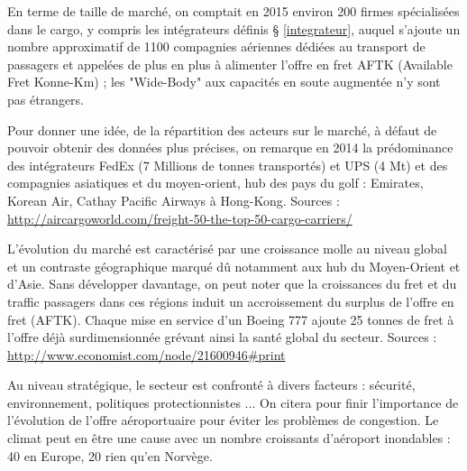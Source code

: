 En terme de taille de marché, on comptait en 2015 environ 200 firmes spécialisées dans le cargo, y compris les intégrateurs définis § \ref{integrateur}, auquel s'ajoute un nombre approximatif de 1100 compagnies aériennes dédiées au transport de passagers et appelées de plus en plus à alimenter l'offre en fret AFTK (Available Fret Konne-Km) ; les "Wide-Body" aux capacités en soute augmentée n'y sont pas étrangers.

Pour donner une idée, de la répartition des acteurs sur le marché, à défaut de pouvoir obtenir des données plus précises, on remarque en 2014 la prédominance des intégrateurs FedEx (7 Millions de tonnes transportés) et UPS (4 Mt) et des compagnies asiatiques et du moyen-orient, hub des pays du golf : Emirates, Korean Air, Cathay Pacific Airways à Hong-Kong. Sources : \url{http://aircargoworld.com/freight-50-the-top-50-cargo-carriers/} 

L'évolution du marché est caractérisé par une croissance molle au niveau global et un contraste géographique marqué dû notamment aux hub du Moyen-Orient et d'Asie. Sans développer davantage, on peut noter que la croissances du fret et du traffic passagers dans ces régions induit un accroissement du surplus de l'offre en fret (AFTK). Chaque mise en service d'un Boeing 777 ajoute 25 tonnes de fret 
à l'offre déjà surdimensionnée grévant ainsi la santé global du secteur. Sources : \url{http://www.economist.com/node/21600946#print}


Au niveau stratégique, le secteur est confronté à divers facteurs : sécurité, environnement, politiques protectionnistes ... On citera pour finir l'importance
de l'évolution de l'offre aéroportuaire pour éviter les problèmes de congestion.
Le climat peut en être une cause avec un nombre croissants d'aéroport inondables : 40 en Europe, 20 rien qu'en Norvège.

